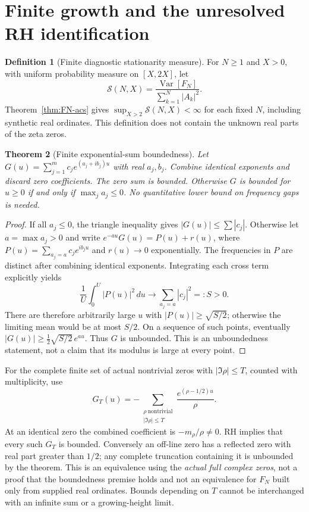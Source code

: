 \documentclass[11pt,a4paper]{article}
\theoremstyle{plain}
\newtheorem{theorem}{Theorem}[section]
\theoremstyle{definition}
\newtheorem{definition}[theorem]{Definition}
\theoremstyle{remark}
\begin{document}
\section{Finite growth and the unresolved RH identification}
\label{sec:converse}
\begin{definition}[Finite diagnostic stationarity measure]\label{def:stationarity}
For $N\ge1$ and $X>0$, with uniform probability measure on $[X,2X]$, let
\[
 \mathcal S(N,X)=\frac{\operatorname{Var}[F_N]}{\sum_{k=1}^N|A_k|^2}.
\]
Theorem~\ref{thm:FN-acs} gives $\sup_{X>2}\mathcal S(N,X)<\infty$
for each fixed $N$, including synthetic real ordinates. This definition
does not contain the unknown real parts of the zeta zeros.
\end{definition}

\begin{theorem}[Finite exponential-sum boundedness]\label{thm:T4prime}
Let $G(u)=\sum_{j=1}^m c_j e^{(a_j+i b_j)u}$ with real $a_j,b_j$.
Combine identical exponents and discard zero coefficients. The zero sum
is bounded. Otherwise $G$ is bounded for $u\ge0$ if and only if
$\max_j a_j\le0$. No quantitative lower bound on frequency gaps is needed.
\end{theorem}
\begin{proof}
If all $a_j\le0$, the triangle inequality gives $|G(u)|\le\sum|c_j|$.
Otherwise let $a=\max a_j>0$ and write $e^{-au}G(u)=P(u)+r(u)$,
where $P(u)=\sum_{a_j=a}c_j e^{i b_j u}$ and $r(u)\to0$ exponentially.
The frequencies in $P$ are distinct after combining identical exponents.
Integrating each cross term explicitly yields
\[
 \frac1U\int_0^U|P(u)|^2\,du
 \longrightarrow \sum_{a_j=a}|c_j|^2=:S>0.
\]
There are therefore arbitrarily large $u$ with $|P(u)|\ge\sqrt{S/2}$;
otherwise the limiting mean would be at most $S/2$. On a sequence of such
points, eventually $|G(u)|\ge\tfrac12\sqrt{S/2}\,e^{au}$.
Thus $G$ is unbounded. This is an unboundedness statement, not a claim
that its modulus is large at every point.
\end{proof}

For the complete finite set of actual nontrivial zeros with
$|\Im\rho|\le T$, counted with
multiplicity, use
\[
 G_T(u)=-\sum_{\substack{\rho\ \mathrm{nontrivial}\\|\Im\rho|\le T}}\frac{e^{(\rho-1/2)u}}{\rho}.
\]
At an identical zero the combined coefficient is $-m_\rho/\rho\ne0$.
RH implies that every such $G_T$ is bounded. Conversely an off-line zero
has a reflected zero with real part greater than $1/2$; any complete
truncation containing it is unbounded by the theorem. This is an
equivalence using the \emph{actual full complex zeros}, not a proof that
the boundedness premise holds and not an equivalence for $F_N$ built
only from supplied real ordinates. Bounds depending on $T$ cannot be
interchanged with an infinite sum or a growing-height limit.
\end{document}
